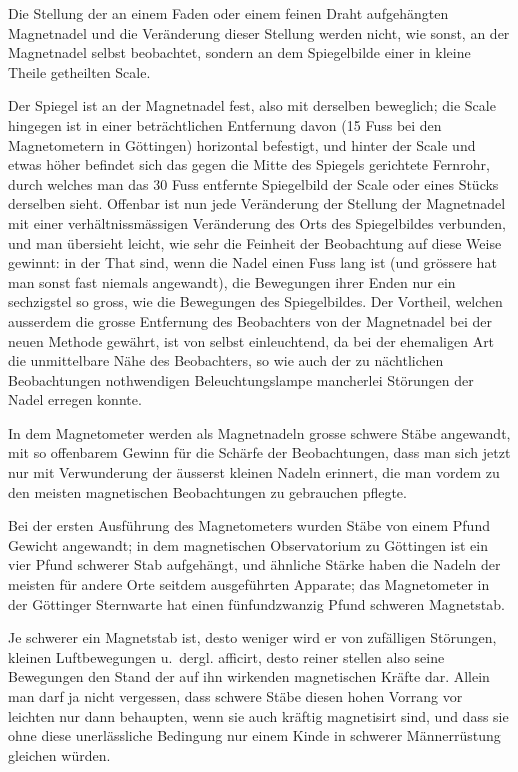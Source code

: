 \documentclass[12pt,a4paper]{article}
\begin{document}
Die Stellung der an einem Faden oder einem feinen Draht aufgehängten Magnetnadel und die Veränderung dieser Stellung werden nicht, wie sonst, an der Magnetnadel selbst beobachtet, sondern an dem Spiegelbilde einer in kleine Theile getheilten Scale.

Der Spiegel ist an der Magnetnadel fest, also mit derselben beweglich; die Scale hingegen ist in einer beträchtlichen Entfernung davon (15 Fuss bei den Magnetometern in Göttingen) horizontal befestigt, und hinter der Scale und etwas höher befindet sich das gegen die Mitte des Spiegels gerichtete Fernrohr, durch welches man das 30 Fuss entfernte Spiegelbild der Scale oder eines Stücks derselben sieht. Offenbar ist nun jede Veränderung der Stellung der Magnetnadel mit einer verhältnissmässigen Veränderung des Orts des Spiegelbildes verbunden, und man übersieht leicht, wie sehr die Feinheit der Beobachtung auf diese Weise gewinnt: in der That sind, wenn die Nadel einen Fuss lang ist (und grössere hat man sonst fast niemals angewandt), die Bewegungen ihrer Enden nur ein sechzigstel so gross, wie die Bewegungen des Spiegelbildes. Der Vortheil, welchen ausserdem die grosse Entfernung des Beobachters von der Magnetnadel bei der neuen Methode gewährt, ist von selbst einleuchtend, da bei der ehemaligen Art die unmittelbare Nähe des Beobachters, so wie auch der zu nächtlichen Beobachtungen nothwendigen Beleuchtungslampe mancherlei Störungen der Nadel erregen konnte.

In dem Magnetometer werden als Magnetnadeln grosse schwere Stäbe angewandt, mit so offenbarem Gewinn für die Schärfe der Beobachtungen, dass man sich jetzt nur mit Verwunderung der äusserst kleinen Nadeln erinnert, die man vordem zu den meisten magnetischen Beobachtungen zu gebrauchen pflegte.

Bei der ersten Ausführung des Magnetometers wurden Stäbe von einem Pfund Gewicht angewandt; in dem magnetischen Observatorium zu Göttingen ist ein vier Pfund schwerer Stab aufgehängt, und ähnliche Stärke haben die Nadeln der meisten für andere Orte seitdem ausgeführten Apparate; das Magnetometer in der Göttinger Sternwarte hat einen fünfundzwanzig Pfund schweren Magnetstab.

Je schwerer ein Magnetstab ist, desto weniger wird er von zufälligen Störungen, kleinen Luftbewegungen u.~dergl. afficirt, desto reiner stellen also seine Bewegungen den Stand der auf ihn wirkenden magnetischen Kräfte dar. Allein man darf ja nicht vergessen, dass schwere Stäbe diesen hohen Vorrang vor leichten nur dann behaupten, wenn sie auch kräftig magnetisirt sind, und dass sie ohne diese unerlässliche Bedingung nur einem Kinde in schwerer Männerrüstung gleichen würden.
\end{document}

